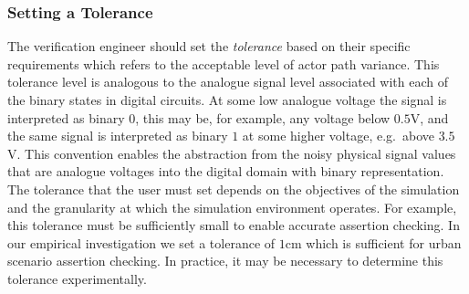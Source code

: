 \documentclass[letterpaper, 10 pt, journal, twoside]{IEEEtran}
\begin{document}
\subsubsection{Setting a Tolerance} \label{s:threshold}
The verification engineer should set the \textit{tolerance} based on their specific requirements which refers to the acceptable level of actor path variance. %
This tolerance level is analogous to the analogue signal level associated with each of the binary states %
in digital circuits. At some low analogue voltage the signal is interpreted as binary $0$, this may be, for example, any voltage below $0.5$V, and the same signal is interpreted as binary $1$ at some higher voltage, e.g.\ above $3.5$V. This convention enables the abstraction from the noisy physical signal values that are analogue voltages into the digital domain with binary representation. 
%
The tolerance that the user must set depends on the objectives of the simulation and the granularity at which the simulation environment operates. For example, this tolerance must be sufficiently small to enable accurate assertion checking. In our empirical investigation we set a tolerance of $1$cm which is sufficient for urban scenario assertion checking. In practice, it may be necessary to determine this tolerance experimentally. 




\end{document}
